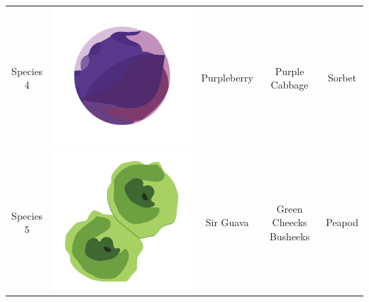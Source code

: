 \begin{table}
\begin{tabular}{ | c | c | c | c | c | }
Species 4  & \includegraphics[valign=m,scale=0.1]{images/species_04.png} & Purpleberry & Purple Cabbage & Sorbet \\ 
Species 5  & \includegraphics[valign=m,scale=0.1]{images/species_05.png} & Sir Guava & Green Cheecks Busheeks & Peapod \\ 

\end{tabular}
\end{table}
